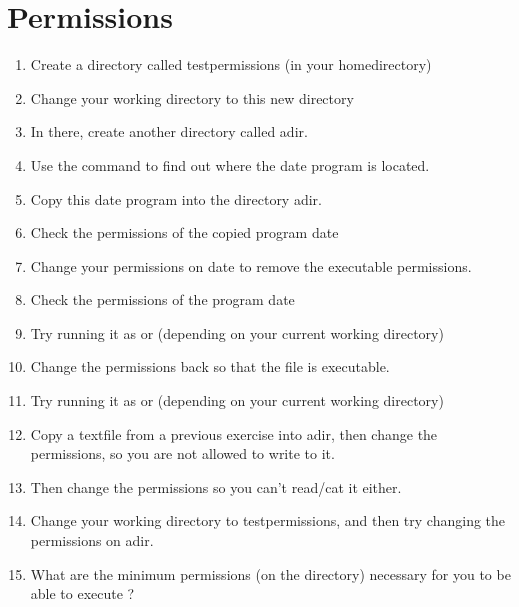 \documentclass[a4paper,11pt,english]{sphinxmanual}
\begin{document}
\section{Permissions}
\label{exercises/exercises_beginner:permissions}\begin{enumerate}
\item {} 
Create a directory called testpermissions (in your homedirectory)

\item {} 
Change your working directory to this new directory

\item {} 
In there, create another directory called adir.

\item {} 
Use the command  to find out where the date program is located.

\item {} 
Copy this date program into the directory adir.

\item {} 
Check the permissions of the copied program date

\item {} 
Change your permissions on date to remove the executable permissions.

\item {} 
Check the permissions of the program date

\item {} 
Try running it as  or  (depending on your current working directory)

\item {} 
Change the permissions back so that the file is executable.

\item {} 
Try running it as  or  (depending on your current working directory)

\item {} 
Copy a textfile from a previous exercise into adir, then change the permissions, so you are not allowed to write to it.

\item {} 
Then change the permissions so you can't read/cat it either.

\item {} 
Change your working directory to testpermissions, and then try changing the permissions on adir.

\item {} 
What are the minimum permissions (on the directory) necessary for you to be able to execute ?

\end{enumerate}
\end{document}
